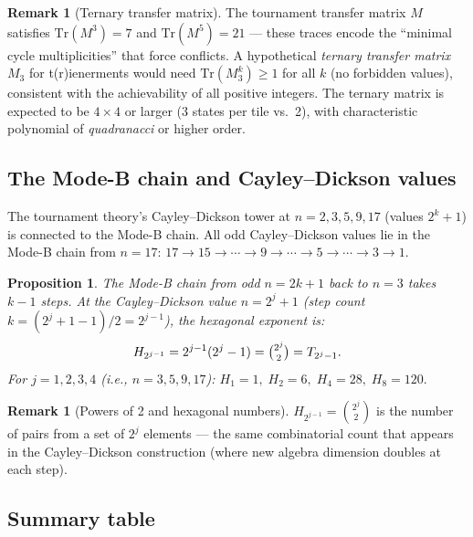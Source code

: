 \documentclass[12pt,reqno]{amsart}
\newtheorem{proposition}[theorem]{Proposition}
\theoremstyle{definition}
\newtheorem{remark}[theorem]{Remark}
\theoremstyle{plain}
\begin{document}
\begin{remark}[Ternary transfer matrix]
The tournament transfer matrix $M$ satisfies $\mathrm{Tr}(M^3)=7$ and
$\mathrm{Tr}(M^5)=21$ — these traces encode the ``minimal cycle multiplicities''
that force conflicts.  A hypothetical \emph{ternary transfer matrix} $M_3$
for t(r)ienerments would need $\mathrm{Tr}(M_3^k)\ge 1$ for all $k$ (no
forbidden values), consistent with the achievability of all positive integers.
The ternary matrix is expected to be $4\times4$ or larger (3 states per tile
vs.\ 2), with characteristic polynomial of \emph{quadranacci} or higher order.
\end{remark}

\subsection{The Mode-B chain and Cayley--Dickson values}

The tournament theory's Cayley--Dickson tower at $n=2,3,5,9,17$ (values
$2^k+1$) is connected to the Mode-B chain.  All odd Cayley--Dickson values
lie in the Mode-B chain from $n=17$: $17\to15\to\cdots\to9\to\cdots\to5
\to\cdots\to3\to1$.

\begin{proposition}
The Mode-B chain from odd $n=2k+1$ back to $n=3$ takes $k-1$ steps.
At the Cayley--Dickson value $n=2^j+1$ (step count $k=(2^j+1-1)/2=2^{j-1}$),
the hexagonal exponent is:
\[
  H_{2^{j-1}}=2^{j-1}(2^j-1)=\tbinom{2^j}{2}=T_{2^j-1}.
\]
For $j=1,2,3,4$ (i.e., $n=3,5,9,17$):
$H_1=1,\;H_2=6,\;H_4=28,\;H_8=120.$
\end{proposition}

\begin{remark}[Powers of 2 and hexagonal numbers]
$H_{2^{j-1}}=\binom{2^j}{2}$ is the number of pairs from a set of $2^j$
elements — the same combinatorial count that appears in the Cayley--Dickson
construction (where new algebra dimension doubles at each step).
\end{remark}

\subsection{Summary table}
\end{document}

